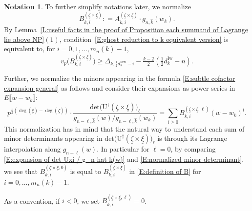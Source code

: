 \documentclass[12pt]{amsart}
\theoremstyle{definition}
\newtheorem{notation}[subsection]{Notation}
\numberwithin{equation}{subsection}
\def\rmU{\mathrm{U}}
\newcommand{\new}{\mathrm{new}}
\newcommand{\Iw}{\mathrm{Iw}}
\renewcommand{\det}{\mathrm{det}}
\begin{document}
\begin{notation}
\label{N:normalized B}
To further simplify notations later, we normalize
\begin{equation}
\label{E:definition of B}
B_{k, i}^{(\underline \zeta \times \underline \xi)}: =  A_{k,i}^{(\underline \zeta \times \underline \xi)} \cdot g_{n, \hat k}(w_k).\end{equation}
By Lemma~\ref{L:useful facts in the proof of Proposition each summand of Lagrange lie above NP}$(1)$, condition~\eqref{E:ghost reduction to k equivalent version} is equivalent to, for $i = 0, 1,\dots, m_n(k)-1$,
\begin{equation}
\label{E:ghost reduction to k B version}
v_p\big( B_{k,i}^{(\underline \zeta \times \underline \xi)} \big) \geq \Delta_{k, \frac 12 d_k^\new-i} - \tfrac{k-2}2 (\tfrac 12 d_k^\Iw-n).
\end{equation}

Further, 
we normalize the minors appearing in the formula \eqref{E:subtle cofactor expansion general} as follows and consider their expansions as power series in $E\llbracket w-w_k\rrbracket$:
\begin{equation}
\label{E:normalized minor determinant}p^{\frac 12(\deg(\underline \xi) - \deg(\underline \zeta))}\cdot
\frac{
\det\big(\rmU^\dagger(\underline \zeta \times \underline \xi)\big)_\ell}{g_{n-\ell,\hat{k}}(w)/g_{n-\ell,\hat{k}}(w_k)}=\sum_{i\geq 0}B_{k,i}^{(\underline \zeta \times \underline \xi, \ell)}(w-w_k)^i.
\end{equation}
This normalization has in mind that the natural way to understand each sum of minor determinants appearing in $\det \big(\rmU^\dagger(\underline \zeta \times \underline \xi)\big)_\ell$ is through its Lagrange interpolation along $g_{n-\ell}(w)$.
In particular for $\ell=0$, by comparing \eqref{E:expansion of det Uxi / g_n hat k(w)} and \eqref{E:normalized minor determinant}, we see that  $B_{k, i}^{(\underline \zeta \times \underline \xi, 0)}$ is equal to $B_{k,i}^{(\underline \zeta \times \underline \xi)}$ in \eqref{E:definition of B} for $i=0,\dots, m_n(k)-1$.

As a convention, if $i<0$, we set $B_{k,i}^{(\underline \zeta \times \underline \xi, \ell)}=0$.
\end{notation}
\end{document}
